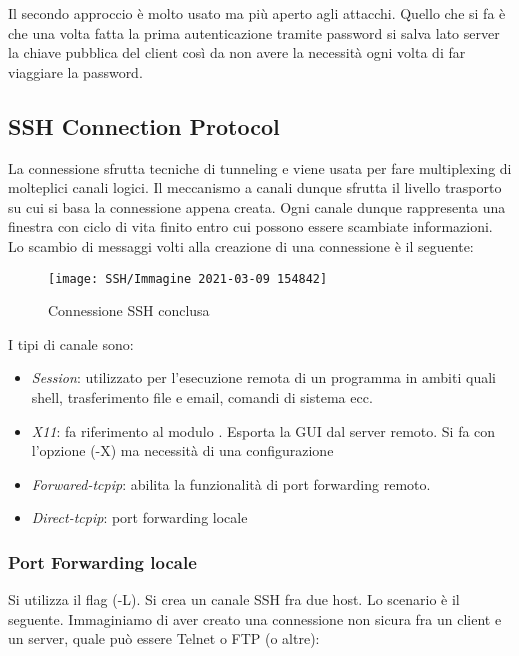 \documentclass[14pt]{extreport}
\begin{document}
Il secondo approccio è molto usato ma più aperto agli attacchi. Quello che si fa è che una volta fatta la prima autenticazione tramite password si salva lato server la chiave pubblica del client così da non avere la necessità ogni volta di far viaggiare la password.



\subsection{SSH Connection Protocol}
La connessione sfrutta tecniche di tunneling e viene usata per fare multiplexing di molteplici canali logici. Il meccanismo a canali dunque sfrutta il livello trasporto su cui si basa la connessione appena creata. Ogni canale dunque rappresenta una finestra con ciclo di vita finito entro cui possono essere scambiate informazioni. Lo scambio di messaggi volti alla creazione di una connessione è il seguente:



\begin{figure}[H]
    \centering
    \texttt{[image: SSH/Immagine 2021-03-09 154842]}
    \caption{Connessione SSH conclusa}
\end{figure}


I tipi di canale sono:


\begin{itemize}
    \item \textit{Session}: utilizzato per l'esecuzione remota di un programma in ambiti quali shell, trasferimento file e email, comandi di sistema ecc.
    
    
    \item \textit{X11}: fa riferimento al modulo . Esporta la GUI dal server remoto. Si fa con l'opzione (-X) ma necessità di una configurazione 
    
    \item \textit{Forwared-tcpip}: abilita la funzionalità di port forwarding remoto.
    
    
    \item \textit{Direct-tcpip}: port forwarding locale
\end{itemize}


\subsubsection{Port Forwarding locale}
Si utilizza il flag (-L).
Si crea un canale SSH fra due host. Lo scenario è il seguente. Immaginiamo di aver creato una connessione non sicura fra un client e un server, quale può essere Telnet o FTP (o altre):
\end{document}
